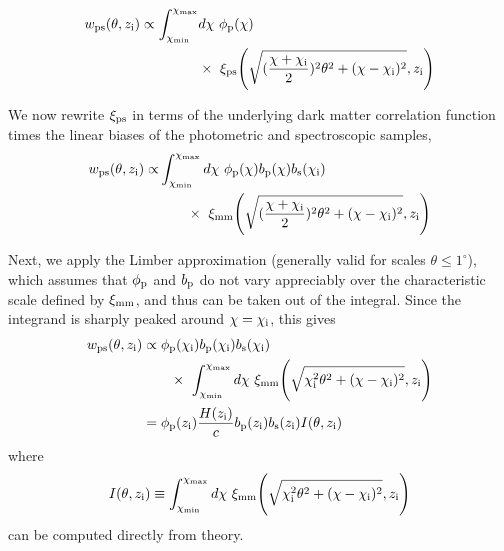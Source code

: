 %
\begin{align}\label{after_dirac}
    {w}_{\rm ps}(\theta, z_{\rm i}) \propto \int_{\chi_{\rm min}}^{\chi_{\rm max}} &d\chi \ \phi_{\rm p}(\chi) \nonumber \\
    &\times \ \xi_{\rm ps}{\Bigg (}\sqrt{(\frac{\chi + \chi_{\rm i}}{2})^2\theta^2 + (\chi-\chi_{\rm i})^2},z_{\rm i}{\Bigg )}
\end{align}
%

We now rewrite $\xi_{\rm ps}$ in terms of the underlying dark matter correlation function times the linear biases of the photometric and spectroscopic samples,
%
\begin{align}\label{add_biases}
    {w}_{\rm ps}(\theta, z_{\rm i}) \propto & \int_{\chi_{\rm min}}^{\chi_{\rm max}} d\chi \ \phi_{\rm p}(\chi)b_{\rm p}(\chi)b_{\rm s} (\chi_{\rm i}) \nonumber \\
    & \hspace{0.7cm} \times \ \xi_{\rm mm}{\Bigg (}\sqrt{(\frac{\chi + \chi_{\rm i}}{2})^2\theta^2 + (\chi-\chi_{\rm i})^2},z_{\rm i}{\Bigg )}
\end{align}
%

Next, we apply the Limber approximation (generally valid for scales $\theta \leq 1^{\circ}$), which assumes that $\phi_{\rm p}$ and $b_{\rm p}$ do not vary appreciably over the characteristic scale defined by $\xi_{\rm mm}$, and thus can be taken out of the integral. Since the integrand is sharply peaked around $\chi = \chi_{\rm i}$, this gives 
%
\begin{align}\label{after_limber}
    {w}_{\rm ps}(\theta, z_{\rm i}) &\propto \phi_{\rm p}(\chi_{\rm i})b_{\rm p}(\chi_{\rm i})b_{\rm s}(\chi_{\rm i}) \nonumber \\
    & \hspace{0.7cm} \times \ \int_{\chi_{\rm min}}^{\chi_{\rm max}}d\chi \ \xi_{\rm mm}{\Bigg (}\sqrt{\chi_{\rm i}^2\theta^2 + (\chi-\chi_{\rm i})^2},z_{\rm i}{\Bigg )} \\
    &= \phi_{\rm p}(z_{\rm i})\frac{H(z_{\rm i})}{c}b_{\rm p}(z_{\rm i})b_{\rm s}(z_{\rm i})I(\theta, z_{\rm i}) \label{eqn:full}
\end{align}
%
where
%
\begin{equation}\label{defn_I}
    I(\theta, z_{\rm i}) \equiv \int_{\chi_{\rm min}}^{\chi_{\rm max}}d\chi \ \xi_{\rm mm}{\Bigg (}\sqrt{\chi_{\rm i}^2\theta^2 + (\chi-\chi_{\rm i})^2},z_{\rm i}{\Bigg )}
\end{equation}
%
can be computed directly from theory.

